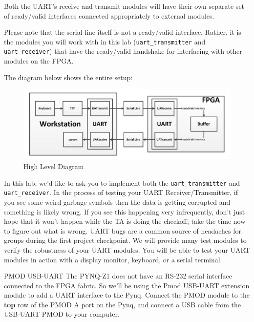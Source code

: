\documentclass[11pt]{article}
\makeatletter
\renewcommand{\subsection}
{\@startsection {subsection}{1}{0pt}
 {-1ex}
 {0.5ex}
 {\bfseries\normalsize}}
\makeatother
\begin{document}
Both the UART’s receive and transmit modules will have their own separate set of ready/valid interfaces connected appropriately to external modules.

Please note that the serial line itself is not a ready/valid interface.
Rather, it is the modules you will work with in this lab (\verb|uart_transmitter| and \verb|uart_receiver|) that have the ready/valid handshake for interfacing with other modules on the FPGA.

The diagram below shows the entire setup:

\begin{figure}[H]
  \centerline{\includegraphics[width=6in]{figs/high_level_diagram.png}}
  \caption{High Level Diagram}
\end{figure}

In this lab, we'd like to ask you to implement both the \verb|uart_transmitter| and \verb|uart_receiver|.
In the process of testing your UART Receiver/Transmitter, if you see some weird garbage symbols then the data is getting corrupted and something is likely wrong.
If you see this happening very infrequently, don't just hope that it won't happen while the TA is doing the checkoff; take the time now to figure out what is wrong.
UART bugs are a common source of headaches for groups during the first project checkpoint.
We will provide many test modules to verify the robustness of your UART modules. You will be able to test your UART modules in action with a display monitor, keyboard, or a serial terminal.

\subsection{PMOD USB-UART}
The PYNQ-Z1 does not have an RS-232 serial interface connected to the FPGA fabric.
So we'll be using the \href{https://store.digilentinc.com/pmod-usbuart-usb-to-uart-interface/}{Pmod USB-UART} extension module to add a UART interface to the Pynq.
Connect the PMOD module to the \textbf{top} row of the PMOD A port on the Pynq, and connect a USB cable from the USB-UART PMOD to your computer.
\end{document}
